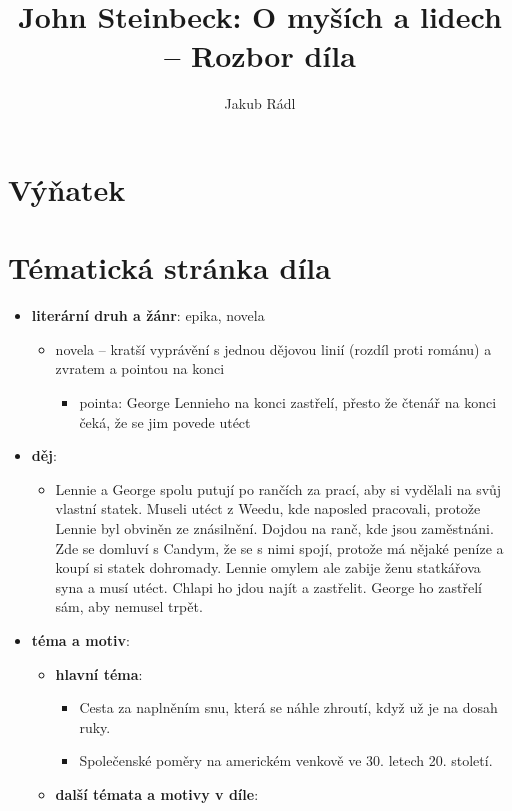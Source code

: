\documentclass[10pt,a4paper]{article}
\date{}
\author{Jakub Rádl}
\title{John Steinbeck: O myších a lidech -- Rozbor díla}
\begin{document}
\maketitle

\section*{Výňatek}

\section*{Tématická stránka díla}
\begin{itemize}
\item \textbf{literární druh a žánr}: epika, novela
	\begin{itemize}
	\item novela -- kratší vyprávění s jednou dějovou linií (rozdíl proti románu) a zvratem a pointou na konci
		\begin{itemize}
		\item pointa: George Lennieho na konci zastřelí, přesto že čtenář na konci čeká, že se jim povede utéct
		\end{itemize}
	\end{itemize}
\item \textbf{děj}:
	\begin{itemize}
	\item Lennie a George spolu putují po rančích za prací, aby si vydělali na svůj vlastní statek. Museli utéct z Weedu, kde naposled pracovali, protože Lennie byl obviněn ze znásilnění. Dojdou na ranč, kde jsou zaměstnáni. Zde se domluví s Candym, že se s nimi spojí, protože má nějaké peníze a koupí si statek dohromady. Lennie omylem ale zabije ženu statkářova syna a musí utéct. Chlapi ho jdou najít a zastřelit. George ho zastřelí sám, aby nemusel trpět.
	\end{itemize}
\item \textbf{téma a motiv}:
	\begin{itemize}
	\item \textbf{hlavní téma}: 
		\begin{itemize}
		\item Cesta za naplněním snu, která se náhle zhroutí, když už je na dosah ruky. 
		\item Společenské poměry na americkém venkově ve 30. letech 20. století.
		\end{itemize}			
	\item \textbf{další témata a motivy v díle}:

\end{itemize}
\end{itemize}
\end{document}
